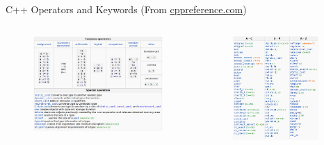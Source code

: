 \begin{frame}[fragile]{C++ Operators and Keywords (From \textcolor{blue}{\href{https://en.cppreference.com/w/cpp/language/}{cppreference.com}})}
	\begin{columns}
		\begin{column}{0.6\textwidth}
			\begin{figure}
				\includegraphics[width=\textwidth]{day8_pm/img/1-operators}
			\end{figure}
		\end{column}
		\begin{column}{0.4\textwidth}
			\begin{figure}
				\includegraphics[width=0.9\textwidth]{day8_pm/img/1-keywords}
			\end{figure}
		\end{column}
	\end{columns}
\end{frame}

